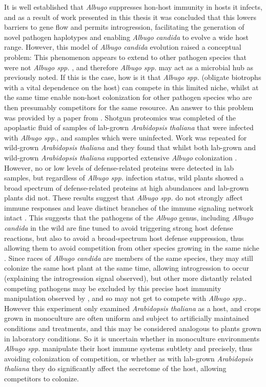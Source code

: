 It is well established that \textit{Albugo} suppresses hon-host immunity in hosts it infects, and as a result of work presented in this thesis it was concluded that this lowers barriers to gene flow and permits introgression, facilitating the generation of novel pathogen haplotypes and enabling \textit{Albugo candida} to evolve a wide host range.
However, this model of \textit{Albugo candida} evolution raised a conceptual problem: 
This phenomenon  appears to extend to other pathogen species that were not \textit{Albugo spp.} \parencite{Belhaj2015}, and therefore \textit{Albugo spp.} may act as a microbial hub as previously noted.
If this is the case, how is it that \textit{Albugo spp.} (obligate biotrophs with a vital dependence on the host) can compete in this limited niche, whilst at the same time enable non-host colonization for other pathogen species who are then presumably competitors for the same resource.
An answer to this problem was provided by a paper from \cite{Ruhe2016}.
Shotgun proteomics was completed of the apoplastic fluid of samples of lab-grown \textit{Arabidopsis thaliana} that were infected with \textit{Albugo spp.}, and samples which were uninfected.
Work was repeated for wild-grown \textit{Arabidopsis thaliana} and they found that whilst both lab-grown and wild-grown \textit{Arabidopsis thaliana} supported extensive \textit{Albugo} colonization \parencite{Ruhe2016}.
However, no or low levels of defense-related proteins were detected in lab samples, but regardless of \textit{Albugo spp.} infection status, wild plants showed a broad spectrum of defense-related proteins at high abundances and lab-grown plants did not.
These results suggest that \textit{Albugo spp.} do not strongly affect immune responses and leave distinct branches of the immune signaling network intact \parencite{Ruhe2016}.
This suggests that the pathogens of the \textit{Albugo} genus, including \textit{Albugo candida} in the wild are fine tuned to avoid triggering strong host defense reactions, but also to avoid a broad-spectrum host defense suppression, thus allowing them to avoid competition from other species growing in the same niche \parencite{Ruhe2016}.
Since races of \textit{Albugo candida} are members of the same species, they may still colonize the same host plant at the same time, allowing introgression to occur (explaining the introgression signal observed), but other more distantly related competing pathogens may be excluded by this precise host immunity manipulation observed by \cite{Ruhe2016}, and so may not get to compete with \textit{Albugo spp.}.
However this experiment only examined \textit{Arabidopsis thaliana} as a host, and crops grown in monoculture are often uniform and subject to artificially maintained conditions and treatments, and this may be considered analogous to plants grown in laboratory conditions.
So it is uncertain whether in monoculture environments \textit{Albugo spp.} manipulate their host immune systems subtlety and precisely, thus avoiding colonization of competition, or whether as with lab-grown \textit{Arabidopsis thaliana} they do significantly affect the secretome of the host, allowing competitors to colonize.

